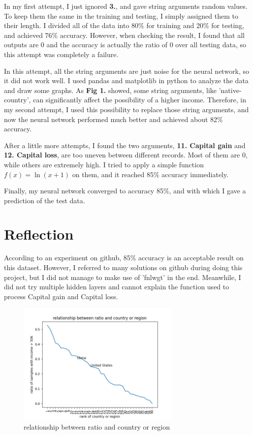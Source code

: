 \documentclass[lettersize,journal]{IEEEtran}
\begin{document}
In my first attempt, I just ignored \textbf{3.}, and gave string arguments random values. To keep them the same in the training and testing, I simply assigned them to their length. I divided all of the data into 80\% for training and 20\% for testing, and achieved 76\% accuracy. However, when checking the result, I found that all outputs are 0 and the accuracy is actually the ratio of 0 over all testing data, so this attempt was completely a failure.

In this attempt, all the string arguments are just noise for the neural network, so it did not work well. I used pandas and matplotlib in python to analyze the data and draw some graphs. As \textbf{Fig 1.} showed, some string arguments, like 'native-country', can significantly affect the possibility of a higher income. Therefore, in my second attempt, I used this possibility to replace those string arguments, and now the neural network performed much better and achieved about 82\% accuracy.

After a little more attempts, I found the two arguments, \textbf{11. Capital gain} and \textbf{12. Capital loss}, are too uneven between different records. Most of them are 0, while others are extremely high. I tried to apply a simple function $f(x)=\ln(x+1)$ on them, and it reached 85\% accuracy immediately.

Finally, my neural network converged to accuracy 85\%, and with which I gave a prediction of the test data.

\section{Reflection}

According to an experiment on github\cite{ref2}, 85\% accuracy is an acceptable result on this dataset. However, I referred to many solutions on github during doing this project, but I did not manage to make use of 'fnlwgt' in the end. Meanwhile, I did not try multiple hidden layers and cannot explain the function used to process Capital gain and Capital loss.

\begin{figure}
    \centering
    \includegraphics[height=6cm,width=8cm]{figure1.png}
    \caption{relationship between ratio and country or region}
    \label{fig1}
\end{figure}
\end{document}
